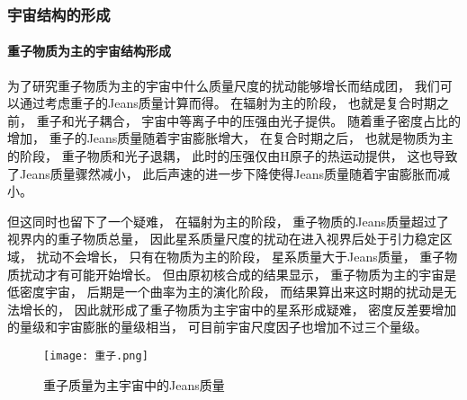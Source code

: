 \documentclass[8pt]{beamer}
\begin{document}
        \begin{frame}[fragile]
            \frametitle{宇宙结构的形成}
            \framesubtitle{重子物质为主的宇宙结构形成}
            \begin{multicols}{2} 
                \qquad
                为了研究重子物质为主的宇宙中什么质量尺度的扰动能够增长而结成团，
                我们可以通过考虑重子的Jeans质量计算而得。
                在辐射为主的阶段，
                也就是复合时期之前，
                重子和光子耦合，
                宇宙中等离子中的压强由光子提供。
                随着重子密度占比的增加，
                重子的Jeans质量随着宇宙膨胀增大，
                在复合时期之后，
                也就是物质为主的阶段，
                重子物质和光子退耦，
                此时的压强仅由H原子的热运动提供，
                这也导致了Jeans质量骤然减小，
                此后声速的进一步下降使得Jeans质量随着宇宙膨胀而减小。

                \qquad
                但这同时也留下了一个疑难，
                在辐射为主的阶段，
                重子物质的Jeans质量超过了视界内的重子物质总量，
                因此星系质量尺度的扰动在进入视界后处于引力稳定区域，
                扰动不会增长，
                只有在物质为主的阶段，
                星系质量大于Jeans质量，
                重子物质扰动才有可能开始增长。
                但由原初核合成的结果显示，
                重子物质为主的宇宙是低密度宇宙，
                后期是一个曲率为主的演化阶段，
                而结果算出来这时期的扰动是无法增长的，
                因此就形成了重子物质为主宇宙中的星系形成疑难，
                密度反差要增加的量级和宇宙膨胀的量级相当，
                可目前宇宙尺度因子也增加不过三个量级。
                \begin{figure}[h]
                    \centering
                    \texttt{[image: 重子.png]}  
                    \caption{重子质量为主宇宙中的Jeans质量}
                \end{figure}
            \end{multicols}
        \end{frame}
\end{document}
